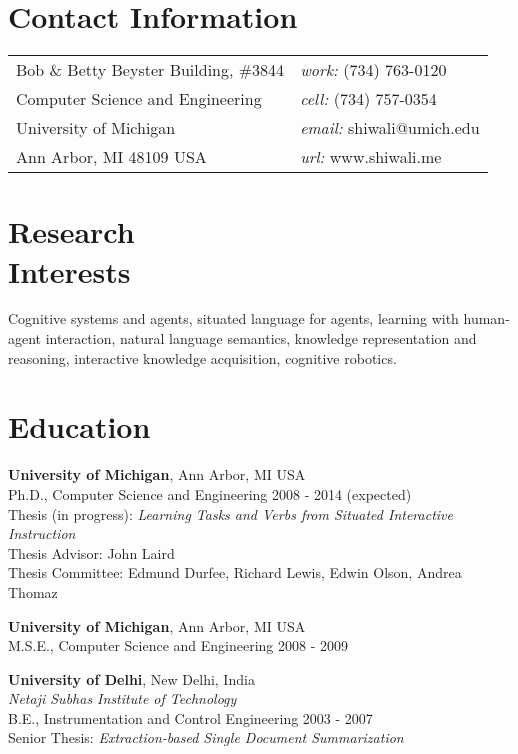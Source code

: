 \documentclass[margin,line,11pt]{res}
\begin{document}

\thispagestyle{empty}
\begin{resume}
\section{\sc Contact Information}
\vspace{.05in}
\begin{tabular}{@{}p{3in}p{4in}}
Bob \& Betty Beyster Building, \#3844             & {\it work:}  (734) 763-0120 \\            
Computer Science and Engineering                  & {\it cell:}    (734) 757-0354 \\         
University of Michigan                            & {\it email:}  shiwali@umich.edu\\       
Ann Arbor, MI  48109 USA                          & {\it url:} www.shiwali.me \\     
\end{tabular}


\section{\sc Research \\Interests}
Cognitive systems and agents, situated language for agents, learning with human-agent interaction, natural language semantics, knowledge representation and reasoning, interactive knowledge acquisition, cognitive robotics.

\section{\sc Education}
{\bf University of Michigan}, Ann Arbor, MI USA\\
Ph.D., Computer Science and Engineering \hfill 2008 - 2014 (expected)\\
Thesis (in progress):  \emph{Learning Tasks and Verbs from Situated Interactive Instruction} \\
Thesis Advisor:  John Laird \\
Thesis Committee: Edmund Durfee, Richard Lewis, Edwin Olson, Andrea Thomaz

{\bf University of Michigan}, Ann Arbor, MI USA\\
M.S.E., Computer Science and Engineering \hfill 2008 - 2009

{\bf University of Delhi}, New Delhi, India\\
{\em Netaji Subhas Institute of Technology}\\
B.E.,  Instrumentation and Control Engineering \hfill 2003 - 2007\\ 
Senior Thesis: \emph{Extraction-based Single Document Summarization}




\end{resume}
\end{document}
